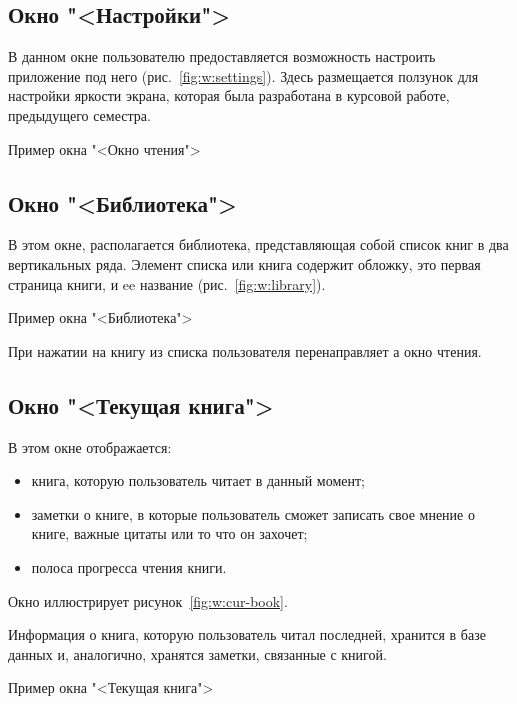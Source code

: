 \subsection{Окно "<Настройки">}
В данном окне пользователю предоставляется возможность настроить
приложение под него (рис.~\ref{fig:w:settings}).
Здесь размещается ползунок для настройки яркости экрана,
которая была разработана в курсовой работе, предыдущего семестра.

\begin{image}
	\caption{Пример окна "<Окно чтения">}
	\label{fig:w:settings}
\end{image}

\subsection{Окно "<Библиотека">}
В этом окне, располагается библиотека, представляющая собой
список книг в два вертикальных ряда.
Элемент списка или книга содержит обложку, это первая страница книги, и
ee название (рис.~\ref{fig:w:library}).

\begin{image}
	\caption{Пример окна "<Библиотека">}
	\label{fig:w:library}
\end{image}

При нажатии на книгу из списка пользователя перенаправляет а окно
чтения.\par

\subsection{Окно "<Текущая книга">}
В этом окне отображается:
\begin{itemize}
	\item книга, которую пользователь читает в данный момент;
	\item заметки о книге, в которые пользователь сможет записать
		свое мнение о книге, важные цитаты или то что он захочет;
	\item полоса прогресса чтения книги.
\end{itemize}

Окно иллюстрирует рисунок~\ref{fig:w:cur-book}.\par
Информация о книга, которую пользователь читал
последней, хранится в базе данных и, аналогично,
хранятся заметки, связанные с книгой.

\begin{image}
	\caption{Пример окна "<Текущая книга">}
	\label{fig:w:cur-book}
\end{image}

